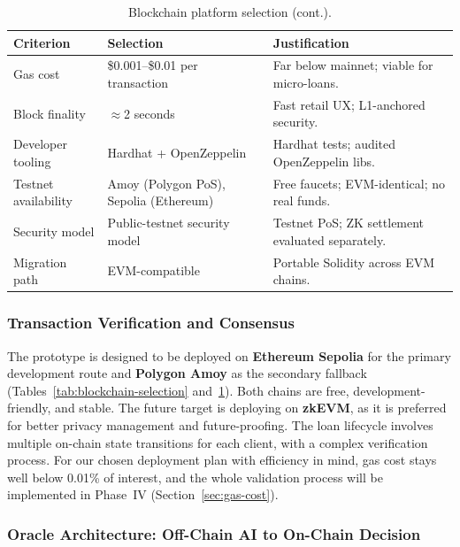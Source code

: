 \begin{table}[H]
\centering
\caption[Blockchain platform selection (cont.)]{Blockchain platform selection (cont.).}
\label{tab:blockchain-selection-cont}
\begin{tabular}{p{3.5cm}p{3.5cm}p{6.5cm}}
\toprule
\tableheadcolor
\textbf{Criterion} & \textbf{Selection} & \textbf{Justification} \\
\midrule
Gas cost & \$0.001--\$0.01 per transaction & Far below mainnet; viable for micro-loans. \\
Block finality & $\approx$2 seconds & Fast retail UX; L1-anchored security. \\
Developer tooling & Hardhat + OpenZeppelin & Hardhat tests; audited OpenZeppelin libs. \\
Testnet availability & Amoy (Polygon PoS), Sepolia (Ethereum) & Free faucets; EVM-identical; no real funds. \\
Security model & Public-testnet security model & Testnet PoS; ZK settlement evaluated separately. \\
Migration path & EVM-compatible & Portable Solidity across EVM chains. \\
\bottomrule
\end{tabular}
\end{table}

\subsubsection{Transaction Verification and Consensus}

The prototype is designed to be deployed on \textbf{Ethereum Sepolia} for the primary development route and \textbf{Polygon Amoy} as the secondary fallback (Tables~\ref{tab:blockchain-selection} and~\ref{tab:blockchain-selection-cont}). Both chains are free, development-friendly, and stable. The future target is deploying on \textbf{zkEVM}, as it is preferred for better privacy management and future-proofing. The loan lifecycle involves multiple on-chain state transitions for each client, with a complex verification process. For our chosen deployment plan with efficiency in mind, gas cost stays well below 0.01\% of interest, and the whole validation process will be implemented in Phase~IV (Section~\ref{sec:gas-cost}).

\subsubsection{Oracle Architecture: Off-Chain AI to On-Chain Decision}
\label{sec:oracle-architecture}

